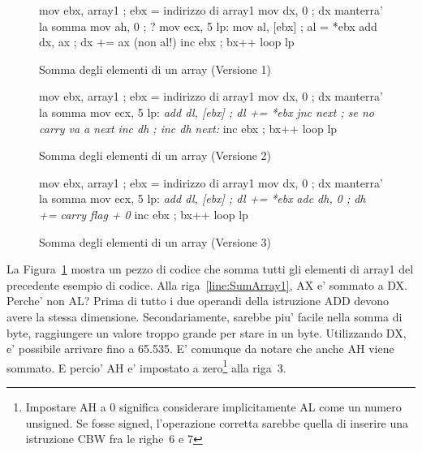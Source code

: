 \begin{figure}[t]
\begin{AsmCodeListing}[frame=single,commandchars=\\\{\}]
      mov    ebx, array1           ; ebx = indirizzo di array1
      mov    dx, 0                 ; dx manterra' la somma
      mov    ah, 0                 ; ?
      mov    ecx, 5
lp:
      mov    al, [ebx]             ; al = *ebx
      add    dx, ax                ; dx += ax (non al!) \label{line:SumArray1}
      inc    ebx                   ; bx++
      loop   lp
\end{AsmCodeListing}
\caption{Somma degli elementi di un array (Versione 1)\label{fig:SumArray1}}
\end{figure}

\begin{figure}[t]
\begin{AsmCodeListing}[frame=single,commandchars=\\\{\}]
      mov    ebx, array1           ; ebx = indirizzo di array1
      mov    dx, 0                 ; dx manterra' la somma
      mov    ecx, 5
lp:
\textit{      add    dl, [ebx]             ; dl += *ebx}
\textit{      jnc    next                  ; se no carry va a next}
\textit{      inc    dh                    ; inc dh}
\textit{next:}
      inc    ebx                   ; bx++
      loop   lp
\end{AsmCodeListing}
\caption{Somma degli elementi di un array (Versione 2)\label{fig:SumArray2}}
\end{figure}

\begin{figure}[t]
\begin{AsmCodeListing}[frame=single,commandchars=\\\{\}]
      mov    ebx, array1           ; ebx = indirizzo di array1
      mov    dx, 0                 ; dx manterra' la somma
      mov    ecx, 5
lp:
\textit{      add    dl, [ebx]             ; dl += *ebx}
\textit{      adc    dh, 0                 ; dh += carry flag + 0}
      inc    ebx                   ; bx++
      loop   lp
\end{AsmCodeListing}
\caption{Somma degli elementi di un array (Versione 3)\label{fig:SumArray3}}
\end{figure}

La Figura~\ref{fig:SumArray1} mostra un pezzo di codice che somma
tutti gli elementi di {\code array1} del precedente esempio di
codice. Alla riga~\ref{line:SumArray1}, AX e' sommato a DX. Perche'
non AL? Prima di tutto i due operandi della istruzione {\code ADD}
devono avere la stessa dimensione. Secondariamente, sarebbe piu'
facile nella somma di byte, raggiungere un valore troppo grande per 
stare in un byte. Utilizzando DX, e' possibile arrivare fino a
65.535. E' comunque da notare che anche AH viene sommato. E percio' 
AH e' impostato a zero\footnote{Impostare AH a 0 significa considerare
implicitamente AL come un numero unsigned. Se fosse signed, l'operazione
corretta sarebbe quella di inserire una istruzione {\code CBW} fra le
righe~6 e 7} alla riga~3.


